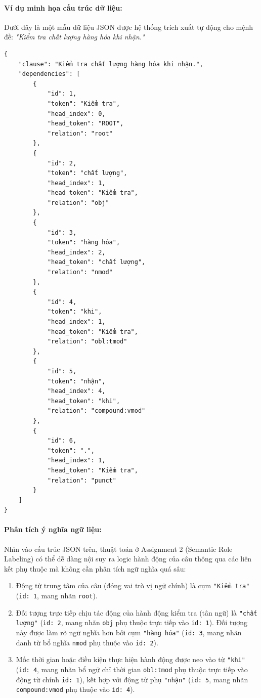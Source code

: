 \paragraph{Ví dụ minh họa cấu trúc dữ liệu:}
Dưới đây là một mẫu dữ liệu JSON được hệ thống trích xuất tự động cho mệnh đề: \textit{"Kiểm tra chất lượng hàng hóa khi nhận."}

\begin{verbatim}
{
    "clause": "Kiểm tra chất lượng hàng hóa khi nhận.",
    "dependencies": [
        {
            "id": 1,
            "token": "Kiểm tra",
            "head_index": 0,
            "head_token": "ROOT",
            "relation": "root"
        },
        {
            "id": 2,
            "token": "chất lượng",
            "head_index": 1,
            "head_token": "Kiểm tra",
            "relation": "obj"
        },
        {
            "id": 3,
            "token": "hàng hóa",
            "head_index": 2,
            "head_token": "chất lượng",
            "relation": "nmod"
        },
        {
            "id": 4,
            "token": "khi",
            "head_index": 1,
            "head_token": "Kiểm tra",
            "relation": "obl:tmod"
        },
        {
            "id": 5,
            "token": "nhận",
            "head_index": 4,
            "head_token": "khi",
            "relation": "compound:vmod"
        },
        {
            "id": 6,
            "token": ".",
            "head_index": 1,
            "head_token": "Kiểm tra",
            "relation": "punct"
        }
    ]
}
\end{verbatim}

\paragraph{Phân tích ý nghĩa ngữ liệu:}
Nhìn vào cấu trúc JSON trên, thuật toán ở Assignment 2 (Semantic Role Labeling) có thể dễ dàng nội suy ra logic hành động của câu thông qua các liên kết phụ thuộc mà không cần phân tích ngữ nghĩa quá sâu:
\begin{enumerate}
    \item Động từ trung tâm của câu (đóng vai trò vị ngữ chính) là cụm \texttt{"Kiểm tra"} (\texttt{id: 1}, mang nhãn \texttt{root}).
    \item Đối tượng trực tiếp chịu tác động của hành động kiểm tra (tân ngữ) là \texttt{"chất lượng"} (\texttt{id: 2}, mang nhãn \texttt{obj} phụ thuộc trực tiếp vào \texttt{id: 1}). Đối tượng này được làm rõ ngữ nghĩa hơn bởi cụm \texttt{"hàng hóa"} (\texttt{id: 3}, mang nhãn danh từ bổ nghĩa \texttt{nmod} phụ thuộc vào \texttt{id: 2}).
    \item Mốc thời gian hoặc điều kiện thực hiện hành động được neo vào từ \texttt{"khi"} (\texttt{id: 4}, mang nhãn bổ ngữ chỉ thời gian \texttt{obl:tmod} phụ thuộc trực tiếp vào động từ chính \texttt{id: 1}), kết hợp với động từ phụ \texttt{"nhận"} (\texttt{id: 5}, mang nhãn \texttt{compound:vmod} phụ thuộc vào \texttt{id: 4}).
\end{enumerate}

